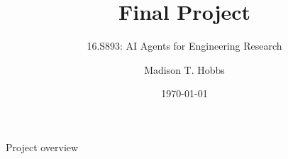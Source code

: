 \documentclass[9pt,compress,t]{beamer}
\title[Final Project]{Final Project}
\subtitle{16.S893: AI Agents for Engineering Research}
\author[Madison T. Hobbs]{Madison T. Hobbs}
\institute[MIT]{Massachusetts Institute of Technology}
\date{\today}
\begin{document}
\titleframe

\begin{frame}{Project overview}
\end{frame}


\end{document}
